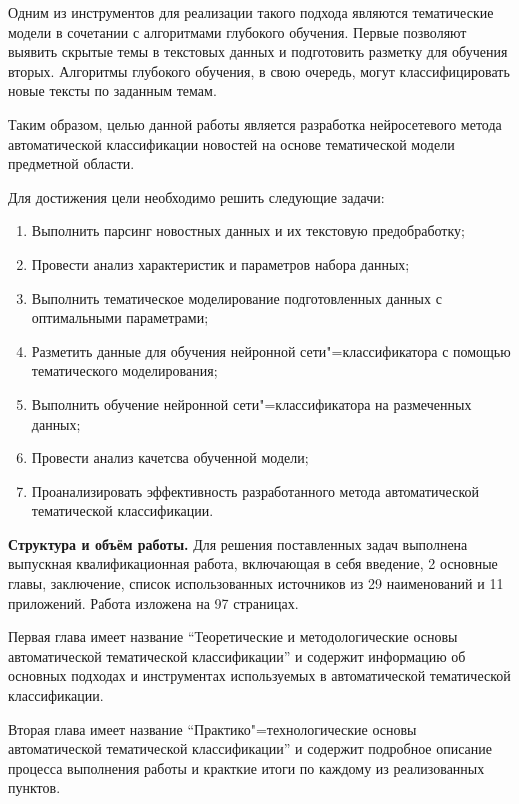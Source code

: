 \documentclass[autoref]{SCWorks}
\begin{document}
Одним из инструментов для реализации такого подхода являются тематические
модели в сочетании с алгоритмами глубокого обучения. Первые позволяют выявить
скрытые темы в текстовых данных и подготовить разметку для обучения вторых.
Алгоритмы глубокого обучения, в свою очередь, могут классифицировать новые
тексты по заданным темам.

Таким образом, целью данной работы является разработка нейросетевого метода
автоматической классификации новостей на основе тематической модели предметной
области.

Для достижения цели необходимо решить следующие задачи:
\begin{enumerate}
    \item Выполнить парсинг новостных данных и их текстовую предобработку;
    \item Провести анализ характеристик и параметров набора данных;
    \item Выполнить тематическое моделирование подготовленных данных с
    оптимальными параметрами;
    \item Разметить данные для обучения нейронной сети"=классификатора с
    помощью тематического моделирования;
    \item Выполнить обучение нейронной сети"=классификатора на размеченных
    данных;
    \item Провести анализ качетсва обученной модели;
    \item Проанализировать эффективность разработанного метода автоматической
    тематической классификации.
\end{enumerate}

\textbf{Структура и объём работы.}
Для решения поставленных задач выполнена выпускная квалификационная работа,
включающая в себя введение, 2 основные главы, заключение, список использованных
источников из 29 наименований и 11 приложений. Работа изложена на 97
страницах.

Первая глава имеет название \enquote{Теоретические и методологические основы
автоматической тематической классификации} и содержит информацию об основных
подходах и инструментах используемых в автоматической тематической
классификации.

Вторая глава имеет название \enquote{Практико"=технологические основы
автоматической тематической классификации} и содержит подробное
описание процесса выполнения работы и кракткие итоги по каждому из
реализованных пунктов.
\end{document}
